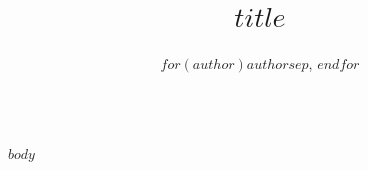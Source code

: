 \documentclass[final]{beamer}
\title{$title$}
\author{$for(author)$$author$$sep$, $endfor$}
\institute[shortinst]{$university$}
\newlength{\sepwidth}
\newcommand{\separatorcolumn}{\begin{column}{\sepwidth}\end{column}}
\begin{document}
\begin{frame}[t,fragile]
	\begin{columns}[t]

		$body$

		\separatorcolumn
	\end{columns}
\end{frame}
\end{document}

